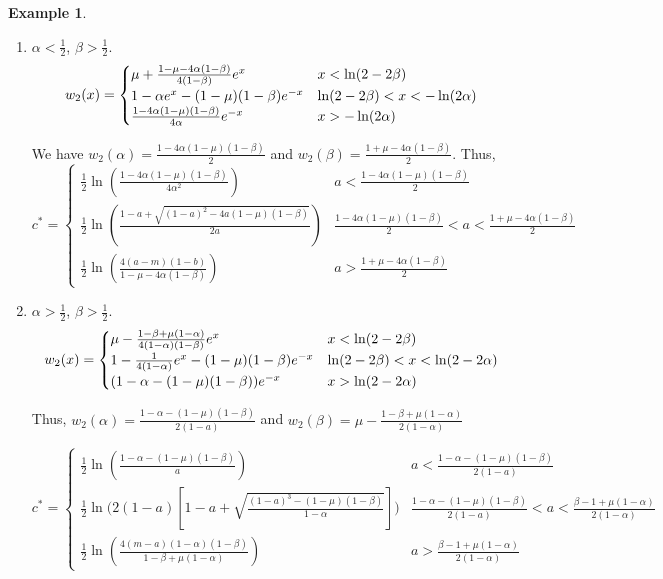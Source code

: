 \documentclass[11pt]{article}
\theoremstyle{definition}
\newtheorem{ex}[thm]{Example}
\numberwithin{equation}{section}
\numberwithin{thm}{section}
\renewcommand{\a}{\alpha}
\renewcommand{\b}{\beta}
\newcommand{\m}{\mu}
\begin{document}
\begin{ex}
\begin{enumerate}[{Case} 1.]
\item $\a<\frac{1}{2}$, $\b>\frac{1}{2}$.
\begin{equation}
w_2(x) = \begin{cases}
\m + \Conecasetwo e^x  & x < \ln(2-2\b) \\
1 - \Ctwocaseone e^x - \Cthreecasetwo e^{-x} & \ln(2-2\b) < x < -\ln(2\a) \\
\Cfourcasetwo e^{-x} & x > -\ln(2\a)
\end{cases}
\end{equation}

We have $w_2(\alpha)=\frac{1-4\a(1-\m)(1-\b)}{2}$ and $w_2(\beta)=\frac{1+\m-4\a(1-\b)}{2}$. Thus,
\begin{equation}
c^* = \begin{cases}
\frac{1}{2} \ln \left( \frac{1-4\a(1-\m)(1-\b)}{4\a^2} \right) & a<\frac{1-4\a(1-\m)(1-\b)}{2} \\
\frac{1}{2} \ln \left( \frac{1-a + \sqrt{(1-a)^2 - 4a(1-\m)(1-\b)}}{2a} \right) & \frac{1-4\a(1-\m)(1-\b)}{2}<a<\frac{1+\m-4\a(1-\b)}{2} \\
\frac{1}{2} \ln \left( \frac{4(a-m)(1-b)}{1-\m-4\a(1-\b)}\right) & a>\frac{1+\m-4\a(1-\b)}{2}
\end{cases}
\end{equation}


\item $\a>\frac{1}{2}$, $\b>\frac{1}{2}$.
\begin{equation}
w_2(x) = \begin{cases}
\m \Conecasethree e^x  & x < \ln(2-2\b) \\
1 - \Ctwocasetwo e^x - \Cthreecasetwo e^{-x} & \ln(2-2\b) < x < \ln(2-2\a) \\
(\Cfourcasethree) e^{-x} & x > \ln(2-2\a)
\end{cases}
\end{equation}

Thus, $w_2(\alpha)=\frac{1-\a-(1-\m)(1-\b)}{2(1-a)}$ and $w_2(\beta)=\m - \frac{1-\b+\m(1-\a)}{2(1-\a)}$

\begin{equation}
c^* = \begin{cases}
\frac{1}{2} \ln \left( \frac{1-\a-(1-\m)(1-\b)}{a} \right) & a<\frac{1-\a-(1-\m)(1-\b)}{2(1-a)} \\
\frac{1}{2} \ln \Big( 2(1-a)\left[1-a + \sqrt{\frac{(1-a)^3-(1-\m)(1-\b) }{1-\a}}\right] \Big) & \frac{1-\a-(1-\m)(1-\b)}{2(1-a)}<a<\frac{\b-1+\m(1-\a)}{2(1-\a)} \\
\frac{1}{2} \ln \left( \frac{4(m-a)(1-\a)(1-\b)}{1-\b+\m(1-\a)}\right) & a>\frac{\b-1+\m(1-\a)}{2(1-\a)}
\end{cases}
\end{equation}


\end{enumerate}
\end{ex}
\end{document}
